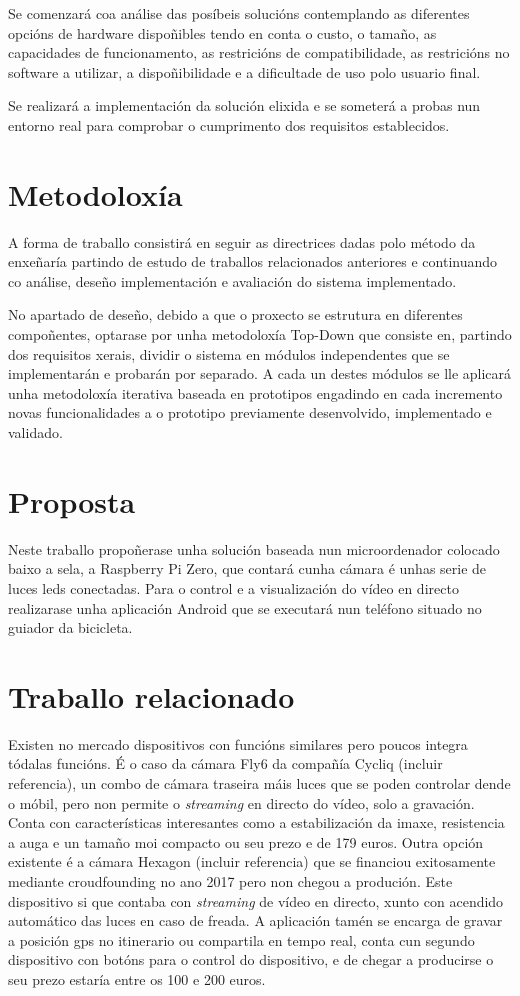 Se comenzará coa análise das posíbeis solucións contemplando as diferentes opcións de hardware dispoñibles tendo en conta o custo, o tamaño, as capacidades de funcionamento, as restricións de compatibilidade, as restricións no software a utilizar, a dispoñibilidade e a dificultade de uso polo usuario final.

Se realizará a implementación da solución elixida e se someterá a probas nun entorno real para comprobar o cumprimento dos requisitos establecidos.


\section{Metodoloxía}
A forma de traballo consistirá en seguir as directrices dadas polo método da enxeñaría partindo de estudo de traballos relacionados anteriores e continuando co análise, deseño implementación e avaliación do sistema implementado.

No apartado de deseño, debido a que o proxecto se estrutura en diferentes compoñentes, optarase por unha metodoloxía Top-Down que consiste en, partindo dos requisitos xerais, dividir o sistema en módulos independentes que se implementarán e probarán por separado. A cada un destes módulos se lle aplicará unha metodoloxía iterativa baseada en prototipos engadindo en cada incremento novas funcionalidades a o prototipo previamente desenvolvido, implementado e validado.

\section{Proposta}
Neste traballo propoñerase unha solución baseada nun microordenador colocado baixo a sela, a Raspberry Pi Zero, que contará cunha cámara é unhas serie de luces leds conectadas. Para o control e a visualización do vídeo en directo realizarase unha aplicación Android que se executará nun teléfono situado no guiador da bicicleta.


\section{Traballo relacionado}
Existen no mercado dispositivos con funcións similares pero poucos integra tódalas funcións. É o caso da cámara Fly6 da compañía Cycliq (incluir referencia), un combo de cámara traseira máis luces que se poden controlar dende o móbil, pero non permite o \emph{streaming} en directo do vídeo, solo a gravación. Conta con características interesantes como a estabilización da imaxe, resistencia a auga e un tamaño moi compacto ou seu prezo e de 179 euros. Outra opción existente é a cámara Hexagon (incluir referencia) que se financiou exitosamente mediante croudfounding no ano 2017 pero non chegou a produción. Este dispositivo si que contaba con \emph{streaming} de vídeo en directo, xunto con acendido automático das luces en caso de freada. A aplicación tamén se encarga de gravar a posición gps no itinerario ou compartila en tempo real, conta cun segundo dispositivo con botóns para o control do dispositivo, e de chegar a producirse o seu prezo estaría entre os 100 e 200 euros.


